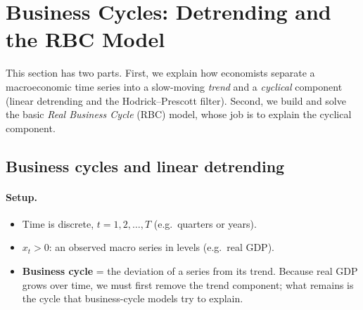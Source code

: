 \section{Business Cycles: Detrending and the RBC Model}

This section has two parts. First, we explain how economists separate a macroeconomic time series into a slow-moving \emph{trend} and a \emph{cyclical} component (linear detrending and the Hodrick--Prescott filter). Second, we build and solve the basic \emph{Real Business Cycle} (RBC) model, whose job is to explain the cyclical component.

\subsection{Business cycles and linear detrending }

\paragraph{Setup.}
\begin{itemize}
  \item Time is discrete, $t=1,2,\dots,T$ (e.g.\ quarters or years).
  \item $x_t>0$: an observed macro series in levels (e.g.\ real GDP).
  \item \textbf{Business cycle} = the deviation of a series from its trend. Because real GDP grows over time, we must first remove the trend component; what remains is the cycle that business-cycle models try to explain.
\end{itemize}

